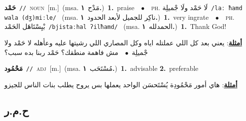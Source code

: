 \documentclass[10pt,a4paper,twoside]{article} %
\begin{document}
\begin{multicols}{2}
{\setlength\topsep{0pt}\textbf{\foreignlanguage{arabic}{حَمْد}}\ {\color{gray}\texttt{//}\color{black}}\ \textsc{noun}\ [m.]\ \color{gray}(msa. \foreignlanguage{arabic}{مَدْح}~\foreignlanguage{arabic}{\textbf{١.}})\color{black}\ \textbf{1.}~praise\ \ $\bullet$\ \ \textsc{ph.} \color{gray} \foreignlanguage{arabic}{لَا حَمْد ولَا جْميلِة}\color{black}\ {\color{gray}\texttt{/{\sffamily laː ħamd wala (dʒ)miːle}/}\color{black}}\ \color{gray} (msa. \foreignlanguage{arabic}{ناكِر للجميل لأبعد الحدود}~\foreignlanguage{arabic}{\textbf{١.}})\color{black}\ \textbf{1.}~very ingrate\ \ $\bullet$\ \ \textsc{ph.} \color{gray} \foreignlanguage{arabic}{بْيِسْتَاهَل الحَمْد}\color{black}\ {\color{gray}\texttt{/{\sffamily bjistaːhal ʔilħamd}/}\color{black}}\ \color{gray} (msa. \foreignlanguage{arabic}{الحمدلله}~\foreignlanguage{arabic}{\textbf{١.}})\color{black}\ \textbf{1.}~Thank God!\  \begin{flushright}\color{gray}\foreignlanguage{arabic}{\textbf{\underline{\foreignlanguage{arabic}{أمثلة}}}: يعني بعد كل اللي عملتله اياه وكل المصاري اللي رشيتها عليه وعأهله لا حَمْد ولا جْميلِة\ $\bullet$\ \  مش فاهمة منطقك؟ حَمْد ربنا بده سبب؟}\end{flushright}\color{black}} \vspace{2mm}

{\setlength\topsep{0pt}\textbf{\foreignlanguage{arabic}{مَحْمُود}}\ {\color{gray}\texttt{//}\color{black}}\ \textsc{adj}\ [m.]\ \color{gray}(msa. \foreignlanguage{arabic}{مُسْتَحَب}~\foreignlanguage{arabic}{\textbf{١.}})\color{black}\ \textbf{1.}~advisable  \textbf{2.}~preferable\  \begin{flushright}\color{gray}\foreignlanguage{arabic}{\textbf{\underline{\foreignlanguage{arabic}{أمثلة}}}: هاي أمور مَحْمُودِة يُسْتَحسَن الواحد يعملها بس يروح يطلب بنات الناس للجيزو}\end{flushright}\color{black}} \vspace{2mm}

\vspace{-3mm}
\subsection*{\color{blue}\foreignlanguage{arabic}{ح.م.ر}\color{blue}{}} 


\end{multicols}
\end{document}
